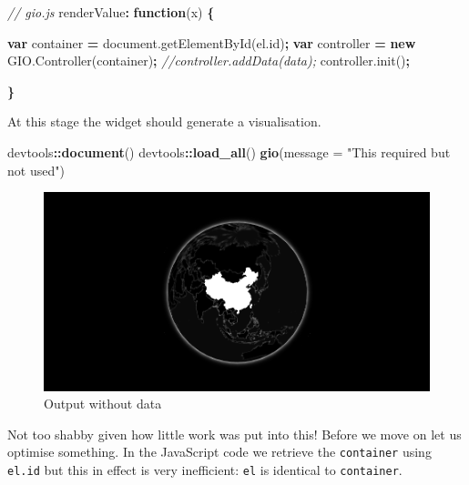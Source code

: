 \documentclass[
]{krantz}
\makeatletter
\newenvironment{Shaded}{\begin{snugshade}}{\end{snugshade}}
\newcommand{\AttributeTok}[1]{\textcolor[rgb]{0.61,0.61,0.61}{#1}}
\newcommand{\CommentTok}[1]{\textcolor[rgb]{0.37,0.37,0.37}{\textit{#1}}}
\newcommand{\DataTypeTok}[1]{\textcolor[rgb]{0.27,0.27,0.27}{#1}}
\newcommand{\KeywordTok}[1]{\textcolor[rgb]{0.27,0.27,0.27}{\textbf{#1}}}
\newcommand{\NormalTok}[1]{#1}
\newcommand{\OperatorTok}[1]{\textcolor[rgb]{0.43,0.43,0.43}{\textbf{#1}}}
\newcommand{\StringTok}[1]{\textcolor[rgb]{0.5,0.5,0.5}{#1}}
\newcommand{\VariableTok}[1]{\textcolor[rgb]{0,0,0}{#1}}
\newenvironment{kframe}{%
\medskip{}
\setlength{\fboxsep}{.8em}
 \def\at@end@of@kframe{}%
 \ifinner\ifhmode%
  \def\at@end@of@kframe{\end{minipage}}%
  \begin{minipage}{\columnwidth}%
 \fi\fi%
 \def\FrameCommand##1{\hskip\@totalleftmargin \hskip-\fboxsep
 \colorbox{shadecolor}{##1}\hskip-\fboxsep
     \hskip-\linewidth \hskip-\@totalleftmargin \hskip\columnwidth}%
 \MakeFramed {\advance\hsize-\width
   \@totalleftmargin\z@ \linewidth\hsize
   \@setminipage}}%
 {\par\unskip\endMakeFramed%
 \at@end@of@kframe}
\renewenvironment{Shaded}{\begin{kframe}}{\end{kframe}}
\makeatother
\begin{document}
\begin{Shaded}
\begin{Highlighting}[]
\CommentTok{// gio.js}
\NormalTok{renderValue}\OperatorTok{:} \KeywordTok{function}\NormalTok{(x) }\OperatorTok{\{}

  \KeywordTok{var}\NormalTok{ container }\OperatorTok{=} \VariableTok{document}\NormalTok{.}\AttributeTok{getElementById}\NormalTok{(}\VariableTok{el}\NormalTok{.}\AttributeTok{id}\NormalTok{)}\OperatorTok{;}
  \KeywordTok{var}\NormalTok{ controller }\OperatorTok{=} \KeywordTok{new} \VariableTok{GIO}\NormalTok{.}\AttributeTok{Controller}\NormalTok{(container)}\OperatorTok{;}
  \CommentTok{//controller.addData(data);}
  \VariableTok{controller}\NormalTok{.}\AttributeTok{init}\NormalTok{()}\OperatorTok{;}

\OperatorTok{\}}
\end{Highlighting}
\end{Shaded}

At this stage the widget should generate a visualisation.

\begin{Shaded}
\begin{Highlighting}[]
\NormalTok{devtools}\OperatorTok{::}\KeywordTok{document}\NormalTok{()}
\NormalTok{devtools}\OperatorTok{::}\KeywordTok{load\_all}\NormalTok{()}
\KeywordTok{gio}\NormalTok{(}\DataTypeTok{message =} \StringTok{"This required but not used"}\NormalTok{)}
\end{Highlighting}
\end{Shaded}

\begin{figure}
\centering
\includegraphics{images/gio-init.png}
\caption{Output without data}
\end{figure}

Not too shabby given how little work was put into this! Before we move on let us optimise something. In the JavaScript code we retrieve the \texttt{container} using \texttt{el.id} but this in effect is very inefficient: \texttt{el} is identical to \texttt{container}.
\end{document}
